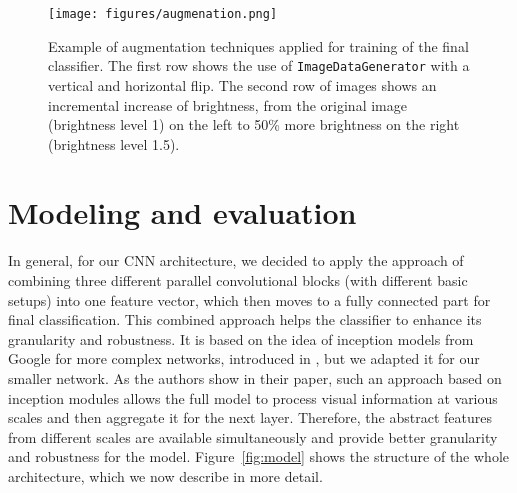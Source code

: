 \documentclass[fleqn,usenatbib]{mnras}
\begin{document}
\begin{figure}
    \centering
    \texttt{[image: figures/augmenation.png]}
    \caption{Example of augmentation techniques applied for training of the final classifier. The first row shows the use of \texttt{ImageDataGenerator} with a vertical and horizontal flip. The second row of images shows an incremental increase of brightness, from the original image (brightness level 1) on the left to 50\% more brightness on the right (brightness level 1.5).}
    \label{fig:augmentation2}
\end{figure}



\section{Modeling and evaluation}\label{eval}

\begin{figure*}
    \centering
    \caption{The architecture of the convolutional neural network with visualization of feature maps. This graph shows particular layers with input and output sizes. An Input image is processed using three convolutional blocks with different filters. The output of convolutions is then combined into one vector in the concatenate layer. After regularization based on dropout, we apply two fully connected (dense) layers for final classification. For convolutional blocks and first dense layer activation function is ReLU. The last layer is the output layer of the architecture with four neurons and Softmax activation function, which represents the classification of input images into four classes.}
    \label{fig:model}
\end{figure*}


In general, for our CNN architecture, we decided to apply the approach of combining three different parallel convolutional blocks (with different basic setups) into one feature vector, which then moves to a fully connected part for final classification. This combined approach helps the classifier to enhance its granularity and robustness. It is based on the idea of inception models from Google for more complex networks, introduced in \cite{szegedy2015going}, but we adapted it for our smaller network. As the authors show in their paper, such an approach based on inception modules allows the full model to process visual information at various scales and then aggregate it for the next layer. Therefore, the abstract features from different scales are available simultaneously and provide better granularity and robustness for the model. Figure~\ref{fig:model} shows the structure of the whole architecture, which we now describe in more detail.    
\end{document}
